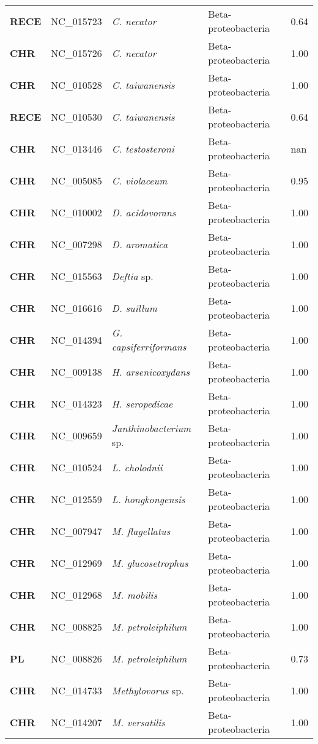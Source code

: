 \begin{adjustwidth}{-3cm}{2cm}
{\begin{supertabular}{>{\bfseries}l|p{0.1\textwidth}p{0.14\textwidth}l|l}
RECE & NC\_015723 & \textit{C. necator} & Beta-proteobacteria & 0.64\\
CHR & NC\_015726 & \textit{C. necator} & Beta-proteobacteria & 1.00\\
CHR & NC\_010528 & \textit{C. taiwanensis} & Beta-proteobacteria & 1.00\\
RECE & NC\_010530 & \textit{C. taiwanensis} & Beta-proteobacteria & 0.64\\
CHR & NC\_013446 & \textit{C. testosteroni} & Beta-proteobacteria & nan\\
CHR & NC\_005085 & \textit{C. violaceum} & Beta-proteobacteria & 0.95\\
CHR & NC\_010002 & \textit{D. acidovorans} & Beta-proteobacteria & 1.00\\
CHR & NC\_007298 & \textit{D. aromatica} & Beta-proteobacteria & 1.00\\
CHR & NC\_015563 & \textit{Deftia} sp. & Beta-proteobacteria & 1.00\\
CHR & NC\_016616 & \textit{D. suillum} & Beta-proteobacteria & 1.00\\
CHR & NC\_014394 & \textit{G. capsiferriformans} & Beta-proteobacteria & 1.00\\
CHR & NC\_009138 & \textit{H. arsenicoxydans} & Beta-proteobacteria & 1.00\\
CHR & NC\_014323 & \textit{H. seropedicae} & Beta-proteobacteria & 1.00\\
CHR & NC\_009659 & \textit{Janthinobacterium} sp. & Beta-proteobacteria & 1.00\\
CHR & NC\_010524 & \textit{L. cholodnii} & Beta-proteobacteria & 1.00\\
CHR & NC\_012559 & \textit{L. hongkongensis} & Beta-proteobacteria & 1.00\\
CHR & NC\_007947 & \textit{M. flagellatus} & Beta-proteobacteria & 1.00\\
CHR & NC\_012969 & \textit{M. glucosetrophus} & Beta-proteobacteria & 1.00\\
CHR & NC\_012968 & \textit{M. mobilis} & Beta-proteobacteria & 1.00\\
CHR & NC\_008825 & \textit{M. petroleiphilum} & Beta-proteobacteria & 1.00\\
PL & NC\_008826 & \textit{M. petroleiphilum} & Beta-proteobacteria & 0.73\\
CHR & NC\_014733 & \textit{Methylovorus} sp. & Beta-proteobacteria & 1.00\\
CHR & NC\_014207 & \textit{M. versatilis} & Beta-proteobacteria & 1.00\\

\end{supertabular}}
\end{adjustwidth}
